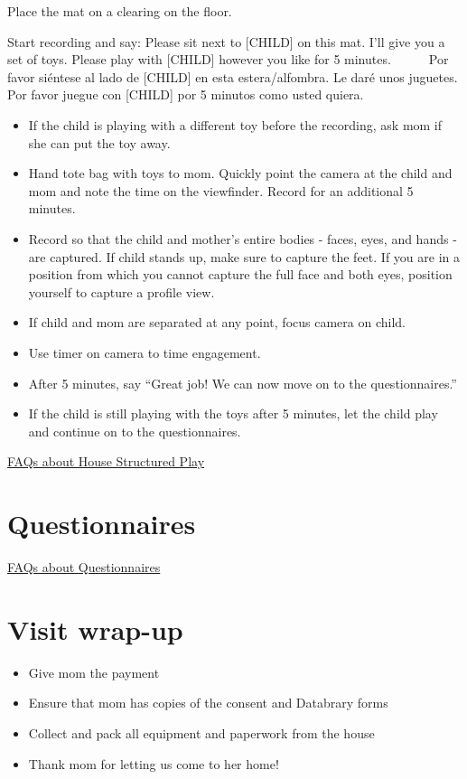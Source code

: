 \documentclass[
  12pt,
]{book}
\providecommand{\tightlist}{%
  \setlength{\itemsep}{0pt}\setlength{\parskip}{0pt}}
\begin{document}
Place the mat on a clearing on the floor.

Start recording and say: Please sit next to {[}CHILD{]} on this mat. I'll give you a set of toys. Please play with {[}CHILD{]} however you like for 5 minutes.
    Por favor siéntese al lado de {[}CHILD{]} en esta estera/alfombra. Le daré unos juguetes. Por favor juegue con {[}CHILD{]} por 5 minutos como usted quiera.

\begin{itemize}
\tightlist
\item
  If the child is playing with a different toy before the recording, ask mom if she can put the toy away.
\item
  Hand tote bag with toys to mom. Quickly point the camera at the child and mom and note the time on the viewfinder. Record for an additional 5 minutes.
\item
  Record so that the child and mother's entire bodies - faces, eyes, and hands - are captured. If child stands up, make sure to capture the feet. If you are in a position from which you cannot capture the full face and both eyes, position yourself to capture a profile view.
\item
  If child and mom are separated at any point, focus camera on child.
\item
  Use timer on camera to time engagement.
\item
  After 5 minutes, say ``Great job! We can now move on to the questionnaires.''
\item
  If the child is still playing with the toys after 5 minutes, let the child play and continue on to the questionnaires.
\end{itemize}

\protect\hyperlink{faqs_structured_play}{FAQs about House Structured Play}

\hypertarget{questionnaires}{%
\section{Questionnaires}\label{questionnaires}}

\protect\hyperlink{faqs_questionnaires}{FAQs about Questionnaires}

\hypertarget{visit-wrap-up}{%
\section{Visit wrap-up}\label{visit-wrap-up}}

\begin{itemize}
\tightlist
\item
  Give mom the payment
\item
  Ensure that mom has copies of the consent and Databrary forms
\item
  Collect and pack all equipment and paperwork from the house
\item
  Thank mom for letting us come to her home!
\end{itemize}
\end{document}
